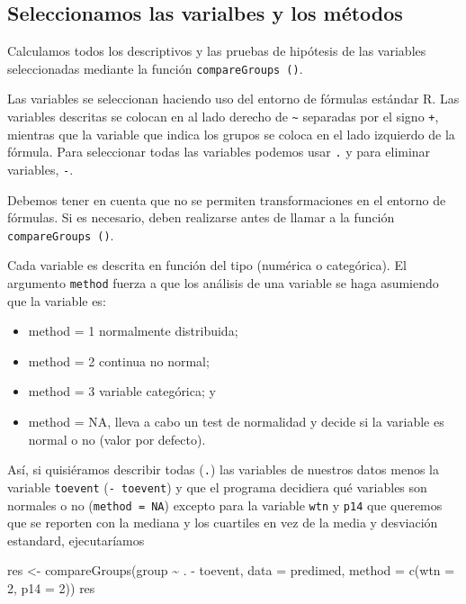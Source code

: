\documentclass[
]{book}
\newenvironment{Shaded}{\begin{snugshade}}{\end{snugshade}}
\newcommand{\AttributeTok}[1]{\textcolor[rgb]{0.77,0.63,0.00}{#1}}
\newcommand{\DecValTok}[1]{\textcolor[rgb]{0.00,0.00,0.81}{#1}}
\newcommand{\FunctionTok}[1]{\textcolor[rgb]{0.00,0.00,0.00}{#1}}
\newcommand{\NormalTok}[1]{#1}
\newcommand{\OtherTok}[1]{\textcolor[rgb]{0.56,0.35,0.01}{#1}}
\newcommand{\SpecialCharTok}[1]{\textcolor[rgb]{0.00,0.00,0.00}{#1}}
\providecommand{\tightlist}{%
  \setlength{\itemsep}{0pt}\setlength{\parskip}{0pt}}
\begin{document}
\hypertarget{seleccionamos-las-varialbes-y-los-muxe9todos}{%
\subsection*{Seleccionamos las varialbes y los métodos}\label{seleccionamos-las-varialbes-y-los-muxe9todos}}

Calculamos todos los descriptivos y las pruebas de hipótesis de las variables seleccionadas mediante la función \texttt{compareGroups\ ()}.

Las variables se seleccionan haciendo uso del entorno de fórmulas estándar R. Las variables descritas se colocan en al lado derecho de \texttt{\textasciitilde{}} separadas por el signo \texttt{+}, mientras que la variable que indica los grupos se coloca en el lado izquierdo de la fórmula. Para seleccionar todas las variables podemos usar \texttt{.} y para eliminar variables, \texttt{-}.

Debemos tener en cuenta que no se permiten transformaciones en el entorno de fórmulas. Si es necesario, deben realizarse antes de llamar a la función \texttt{compareGroups\ ()}.

Cada variable es descrita en función del tipo (numérica o categórica). El argumento \texttt{method} fuerza a que los análisis de una variable se haga asumiendo que la variable es:

\begin{itemize}
\tightlist
\item
  method = 1 normalmente distribuida;
\item
  method = 2 continua no normal;
\item
  method = 3 variable categórica; y
\item
  method = NA, lleva a cabo un test de normalidad y decide si la variable es normal o no (valor por defecto).
\end{itemize}

Así, si quisiéramos describir todas (\texttt{.}) las variables de nuestros datos menos la variable \texttt{toevent} (\texttt{-\ toevent}) y que el programa decidiera qué variables son normales o no (\texttt{method\ =\ NA}) excepto para la variable \texttt{wtn} y \texttt{p14} que queremos que se reporten con la mediana y los cuartiles en vez de la media y desviación estandard, ejecutaríamos

\begin{Shaded}
\begin{Highlighting}[]
\NormalTok{res }\OtherTok{\textless{}{-}} \FunctionTok{compareGroups}\NormalTok{(group }\SpecialCharTok{\textasciitilde{}}\NormalTok{ . }\SpecialCharTok{{-}}\NormalTok{ toevent, }\AttributeTok{data =}\NormalTok{ predimed, }\AttributeTok{method =} \FunctionTok{c}\NormalTok{(}\AttributeTok{wtn =} \DecValTok{2}\NormalTok{, }\AttributeTok{p14 =} \DecValTok{2}\NormalTok{))}
\NormalTok{res}
\end{Highlighting}
\end{Shaded}
\end{document}
